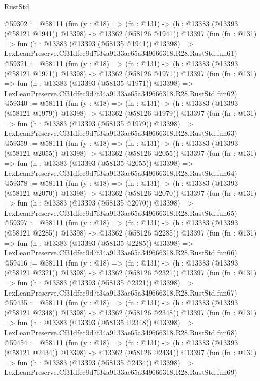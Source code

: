 \begin{lexlean}{RustStd}
\begin{coremodule}
@59302 := @58111
    (fun (y : @18) =>
    (fn : @131) -> (h : @13383 (@13393 (@58121 @1941)) @13398) -> @13362 (@58126 @1941))
    @13397
    (fun (fn : @131) =>
    fun (h : @13383 (@13393 (@58135 @1941)) @13398) =>
    LexLeanPreserve.Cf31dfec9d7f34a9133ae65a349666318.R28.RustStd.fun61)
@59321 := @58111
    (fun (y : @18) =>
    (fn : @131) -> (h : @13383 (@13393 (@58121 @1971)) @13398) -> @13362 (@58126 @1971))
    @13397
    (fun (fn : @131) =>
    fun (h : @13383 (@13393 (@58135 @1971)) @13398) =>
    LexLeanPreserve.Cf31dfec9d7f34a9133ae65a349666318.R28.RustStd.fun62)
@59340 := @58111
    (fun (y : @18) =>
    (fn : @131) -> (h : @13383 (@13393 (@58121 @1979)) @13398) -> @13362 (@58126 @1979))
    @13397
    (fun (fn : @131) =>
    fun (h : @13383 (@13393 (@58135 @1979)) @13398) =>
    LexLeanPreserve.Cf31dfec9d7f34a9133ae65a349666318.R28.RustStd.fun63)
@59359 := @58111
    (fun (y : @18) =>
    (fn : @131) -> (h : @13383 (@13393 (@58121 @2055)) @13398) -> @13362 (@58126 @2055))
    @13397
    (fun (fn : @131) =>
    fun (h : @13383 (@13393 (@58135 @2055)) @13398) =>
    LexLeanPreserve.Cf31dfec9d7f34a9133ae65a349666318.R28.RustStd.fun64)
@59378 := @58111
    (fun (y : @18) =>
    (fn : @131) -> (h : @13383 (@13393 (@58121 @2070)) @13398) -> @13362 (@58126 @2070))
    @13397
    (fun (fn : @131) =>
    fun (h : @13383 (@13393 (@58135 @2070)) @13398) =>
    LexLeanPreserve.Cf31dfec9d7f34a9133ae65a349666318.R28.RustStd.fun65)
@59397 := @58111
    (fun (y : @18) =>
    (fn : @131) -> (h : @13383 (@13393 (@58121 @2285)) @13398) -> @13362 (@58126 @2285))
    @13397
    (fun (fn : @131) =>
    fun (h : @13383 (@13393 (@58135 @2285)) @13398) =>
    LexLeanPreserve.Cf31dfec9d7f34a9133ae65a349666318.R28.RustStd.fun66)
@59416 := @58111
    (fun (y : @18) =>
    (fn : @131) -> (h : @13383 (@13393 (@58121 @2321)) @13398) -> @13362 (@58126 @2321))
    @13397
    (fun (fn : @131) =>
    fun (h : @13383 (@13393 (@58135 @2321)) @13398) =>
    LexLeanPreserve.Cf31dfec9d7f34a9133ae65a349666318.R28.RustStd.fun67)
@59435 := @58111
    (fun (y : @18) =>
    (fn : @131) -> (h : @13383 (@13393 (@58121 @2348)) @13398) -> @13362 (@58126 @2348))
    @13397
    (fun (fn : @131) =>
    fun (h : @13383 (@13393 (@58135 @2348)) @13398) =>
    LexLeanPreserve.Cf31dfec9d7f34a9133ae65a349666318.R28.RustStd.fun68)
@59454 := @58111
    (fun (y : @18) =>
    (fn : @131) -> (h : @13383 (@13393 (@58121 @2434)) @13398) -> @13362 (@58126 @2434))
    @13397
    (fun (fn : @131) =>
    fun (h : @13383 (@13393 (@58135 @2434)) @13398) =>
    LexLeanPreserve.Cf31dfec9d7f34a9133ae65a349666318.R28.RustStd.fun69)

\end{coremodule}
\end{lexlean}
